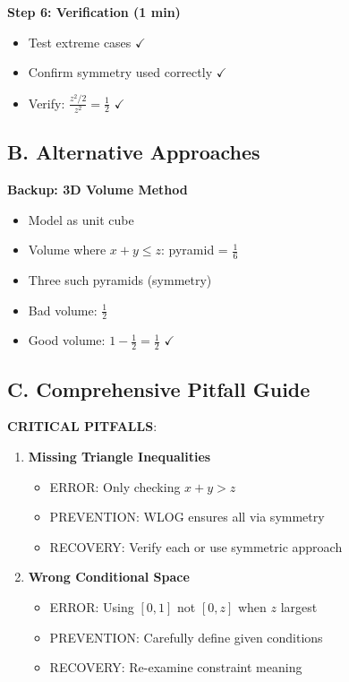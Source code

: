 \documentclass[11pt]{article}
\begin{document}
\begin{roadmapbox}
\textbf{Step 6: Verification (1 min)}
\begin{itemize}
    \item Test extreme cases $\checkmark$
    \item Confirm symmetry used correctly $\checkmark$
    \item Verify: $\frac{z^2/2}{z^2} = \frac{1}{2}$ $\checkmark$
\end{itemize}

\subsection*{B. Alternative Approaches}

\textbf{Backup: 3D Volume Method}
\begin{itemize}
    \item Model as unit cube
    \item Volume where $x+y \leq z$: pyramid = $\frac{1}{6}$
    \item Three such pyramids (symmetry)
    \item Bad volume: $\frac{1}{2}$
    \item Good volume: $1 - \frac{1}{2} = \frac{1}{2}$ $\checkmark$
\end{itemize}

\subsection*{C. Comprehensive Pitfall Guide}

\textbf{CRITICAL PITFALLS}:
\begin{enumerate}
    \item \textbf{Missing Triangle Inequalities}
    \begin{itemize}
        \item ERROR: Only checking $x+y>z$
        \item PREVENTION: WLOG ensures all via symmetry
        \item RECOVERY: Verify each or use symmetric approach
    \end{itemize}
    
    \item \textbf{Wrong Conditional Space}
    \begin{itemize}
        \item ERROR: Using $[0,1]$ not $[0,z]$ when $z$ largest
        \item PREVENTION: Carefully define given conditions
        \item RECOVERY: Re-examine constraint meaning
    \end{itemize}
    

\end{enumerate}
\end{roadmapbox}
\end{document}
